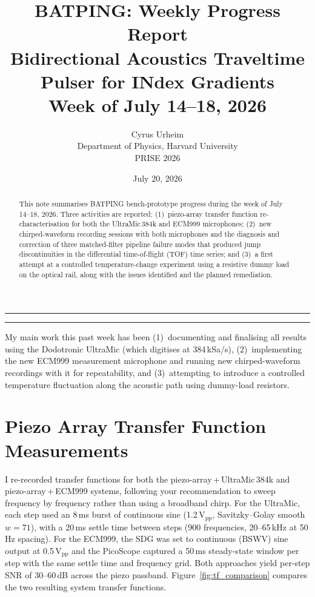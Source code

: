 \documentclass[11pt]{article}
\title{%
  \textbf{BATPING: Weekly Progress Report}\\[4pt]
  \large Bidirectional Acoustics Traveltime Pulser for INdex Gradients\\[2pt]
  \normalsize Week of July 14--18, 2026
}
\author{Cyrus Urheim\\
        \small Department of Physics, Harvard University\\
        \small PRISE 2026
}
\date{July 20, 2026}
\begin{document}
\maketitle
\hrule
\vspace{4pt}

\begin{abstract}
\noindent
This note summarises BATPING bench-prototype progress during the week of
July 14--18, 2026.
Three activities are reported: (1)~piezo-array transfer function
re-characterisation for both the UltraMic\,384k and ECM999 microphones;
(2)~new chirped-waveform recording sessions with both microphones and the
diagnosis and correction of three matched-filter pipeline failure modes that
produced jump discontinuities in the differential time-of-flight (TOF)
time series; and
(3)~a first attempt at a controlled temperature-change experiment using
a resistive dummy load on the optical rail, along with the issues identified
and the planned remediation.
\end{abstract}

\hrule
\bigskip

\noindent
My main work this past week has been (1)~documenting and finalising all results
using the Dodotronic UltraMic (which digitises at 384\,kSa/s),
(2)~implementing the new ECM999 measurement microphone and running new
chirped-waveform recordings with it for repeatability, and (3)~attempting to
introduce a controlled temperature fluctuation along the acoustic path using
dummy-load resistors.

\section{Piezo Array Transfer Function Measurements}

I re-recorded transfer functions for both the piezo-array\,+\,UltraMic\,384k
and piezo-array\,+\,ECM999 systems, following your recommendation to sweep
frequency by frequency rather than using a broadband chirp.
For the UltraMic, each step used an 8\,ms burst of continuous sine (1.2\,V$_\mathrm{pp}$,
Savitzky--Golay smooth $w=71$), with a 20\,ms settle time between steps
(900 frequencies, 20--65\,kHz at 50\,Hz spacing).
For the ECM999, the SDG was set to continuous (BSWV) sine output at 0.5\,V$_\mathrm{pp}$
and the PicoScope captured a 50\,ms steady-state window per step with the
same settle time and frequency grid.
Both approaches yield per-step SNR of 30--60\,dB across the piezo passband.
Figure~\ref{fig:tf_comparison} compares the two resulting system transfer
functions.
\end{document}
